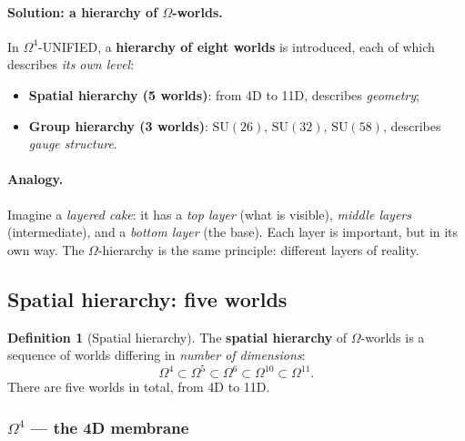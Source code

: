 \documentclass[11pt,a4paper]{article}
\newcommand{\SU}{\mathrm{SU}}
\newcommand{\Om}{\Omega^4}
\newcommand{\Omf}{\Omega^5}
\newcommand{\Oms}{\Omega^6}
\newcommand{\Omt}{\Omega^{10}}
\newcommand{\Ome}{\Omega^{11}}
\theoremstyle{definition}
\newtheorem{definition}[theorem]{Definition}
\begin{document}
\paragraph{Solution: a hierarchy of $\Omega$-worlds.}
In $\Om$-UNIFIED, a \textbf{hierarchy of eight worlds} is introduced, 
each of which describes \emph{its own level}:
\begin{itemize}
    \item \textbf{Spatial hierarchy (5 worlds)}: 
          from 4D to 11D, describes \emph{geometry};
    \item \textbf{Group hierarchy (3 worlds)}: 
          $\SU(26)$, $\SU(32)$, $\SU(58)$, describes 
          \emph{gauge structure}.
\end{itemize}

\paragraph{Analogy.}
Imagine a \emph{layered cake}: it has a \emph{top 
layer} (what is visible), \emph{middle layers} (intermediate), and 
a \emph{bottom layer} (the base). Each layer is important, but in its own way. 
The $\Omega$-hierarchy is the same principle: different layers of reality.

\subsection{Spatial hierarchy: five worlds}
\label{subsec:spatial-hierarchy}

\begin{definition}[Spatial hierarchy]
\label{def:spatial-hierarchy}
The \textbf{spatial hierarchy} of $\Omega$-worlds is a 
sequence of worlds differing in \emph{number of dimensions}:
\begin{equation}
    \Om \subset \Omf \subset \Oms \subset \Omt \subset \Ome.
\end{equation}
There are five worlds in total, from 4D to 11D.
\end{definition}

\subsubsection{$\Om$ — the 4D membrane}
\end{document}
